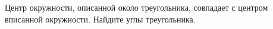\begin{ex}
	\begin{condition}
		Центр окружности, описанной около треугольника, совпадает с центром вписанной окружности. Найдите углы треугольника.
	\end{condition}
\end{ex}